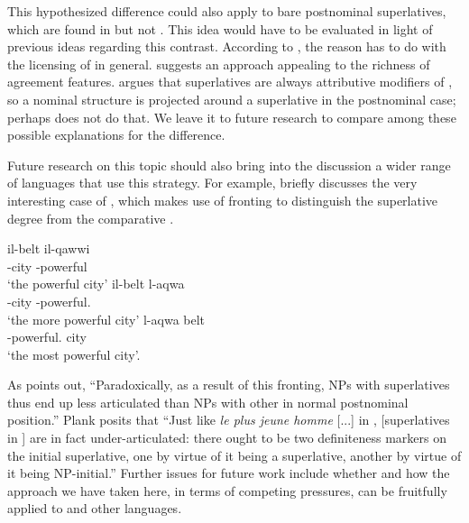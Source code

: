 \documentclass[output=paper
,modfonts
,nonflat]{langsci/langscibook}
\begin{document}
This hypothesized difference could also apply to bare postnominal superlatives, which are found in  but not . This idea would have to be evaluated in light of previous ideas regarding this contrast. According to \citet{Kayne2008}, the reason has to do with the licensing of  in general. \citet[74--75]{Alexiadou2014} suggests an approach appealing to the richness of agreement features. \citet{Matushansky2008} argues that superlatives are always attributive modifiers of , so a nominal structure is projected around a superlative in the postnominal case; perhaps  does not do that. We leave it to future research to compare among these possible explanations for the difference.

Future research on this topic should also bring into the discussion a wider range of languages that use this strategy.  For example, \citet{Plank2003} briefly discusses the very interesting case of , which makes use of fronting to distinguish the superlative degree  from the comparative .

\ea \label{ex:coppockstrand:110}
\begin{xlist}
\ex \label{ex:coppockstrand:110a}
\gll  il-belt il-qawwi\\
-city -powerful\\ 
\glt `the powerful city'
\ex \label{ex:coppockstrand:110b}
\gll  il-belt l-aqwa\\
-city -powerful.\cmpr{}\\
\glt `the more powerful city' \largerpage[2]
\ex \label{ex:coppockstrand:110c}
\gll  l-aqwa belt\\
-powerful.\cmpr{} city\\
\glt  `the most powerful city'.
\end{xlist}
\z

As \citet[361--362]{Plank2003} points out, ``Paradoxically, as a result of this fronting, NPs with superlatives thus end up less articulated than NPs with other  in normal postnominal position.'' Plank posits that ``Just like \textit{le plus jeune homme} [...] in , [superlatives in ] are in fact under-articulated: there ought to be two definiteness markers on the initial superlative, one by virtue of it being a superlative, another by virtue of it being NP-initial.'' Further issues for future work include whether and how the approach we have taken here, in terms of competing pressures, can be fruitfully applied to  and other  languages.
\end{document}
